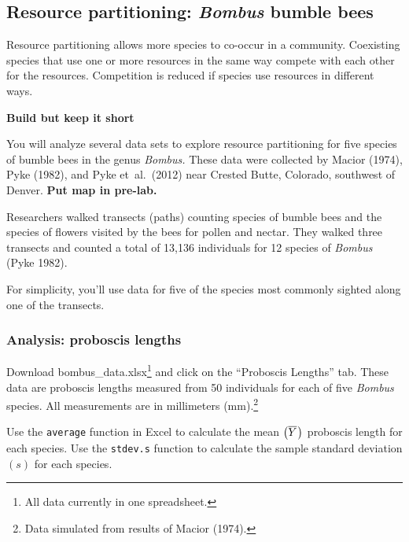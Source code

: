 \documentclass[12pt, hidelinks]{exam}
\newcommand*\meanY{\overline{Y}\kern0.67pt}
\begin{document}
\subsection*{Resource partitioning: \textit{Bombus} bumble bees}

Resource partitioning allows more species to co-occur in a community.
Coexisting species that use one or more resources in the same way compete
with each other for the resources. Competition is reduced if species
use resources in different ways.

\textbf{Build but keep it short}


You will analyze several data sets to explore resource partitioning for five
species of bumble bees in the genus \textit{Bombus.} These data were collected
by Macior (1974), Pyke (1982), and Pyke et~al.~(2012) near Crested Butte, Colorado,
southwest of Denver. \textbf{Put map in pre-lab.}

Researchers walked transects (paths) counting species of bumble bees and the 
species of flowers visited by the bees for pollen and nectar. They walked
three transects and counted a total of 13,136 individuals for 12 species of 
\textit{Bombus} (Pyke 1982).

For simplicity, you'll use data for five of the species most commonly 
sighted along one of the transects.


\subsubsection*{Analysis: proboscis lengths}

Download bombus\_data.xlsx\footnote{All data currently in one
spreadsheet.} and click on the “Proboscis Lengths” tab. These data are
 proboscis lengths measured from 50 individuals for each of five \textit{Bombus} species. All measurements are in millimeters (mm).\footnote{Data simulated 
from results of Macior (1974).}

Use the \texttt{average} function in Excel to calculate the mean $\left(\meanY\right)$ proboscis length for each species. Use the \texttt{stdev.s} function
to calculate the sample standard deviation $\left(s\right)$ for each species. %
%
%
\end{document}
